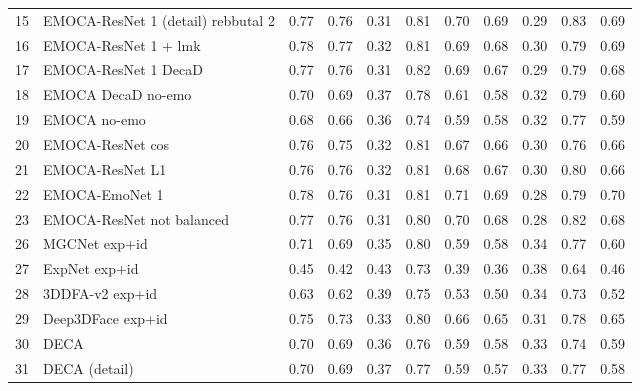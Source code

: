 \begin{tabular}{llrrrrrrrrr}
15 &  EMOCA-ResNet 1 (detail) rebbutal 2 &   0.77 &   0.76 &    0.31 &    0.81 &   0.70 &   0.69 &    0.29 &    0.83 &      0.69 \\
16 &                EMOCA-ResNet 1 + lmk &   0.78 &   0.77 &    0.32 &    0.81 &   0.69 &   0.68 &    0.30 &    0.79 &      0.69 \\
17 &                EMOCA-ResNet 1 DecaD &   0.77 &   0.76 &    0.31 &    0.82 &   0.69 &   0.67 &    0.29 &    0.79 &      0.68 \\
18 &                  EMOCA DecaD no-emo &   0.70 &   0.69 &    0.37 &    0.78 &   0.61 &   0.58 &    0.32 &    0.79 &      0.60 \\
19 &                        EMOCA no-emo &   0.68 &   0.66 &    0.36 &    0.74 &   0.59 &   0.58 &    0.32 &    0.77 &      0.59 \\
20 &                    EMOCA-ResNet cos &   0.76 &   0.75 &    0.32 &    0.81 &   0.67 &   0.66 &    0.30 &    0.76 &      0.66 \\
21 &                     EMOCA-ResNet L1 &   0.76 &   0.76 &    0.32 &    0.81 &   0.68 &   0.67 &    0.30 &    0.80 &      0.66 \\
22 &                      EMOCA-EmoNet 1 &   0.78 &   0.76 &    0.31 &    0.81 &   0.71 &   0.69 &    0.28 &    0.79 &      0.70 \\
23 &           EMOCA-ResNet not balanced &   0.77 &   0.76 &    0.31 &    0.80 &   0.70 &   0.68 &    0.28 &    0.82 &      0.68 \\
26 &                       MGCNet exp+id &   0.71 &   0.69 &    0.35 &    0.80 &   0.59 &   0.58 &    0.34 &    0.77 &      0.60 \\
27 &                       ExpNet exp+id &   0.45 &   0.42 &    0.43 &    0.73 &   0.39 &   0.36 &    0.38 &    0.64 &      0.46 \\
28 &                     3DDFA-v2 exp+id &   0.63 &   0.62 &    0.39 &    0.75 &   0.53 &   0.50 &    0.34 &    0.73 &      0.52 \\
29 &                   Deep3DFace exp+id &   0.75 &   0.73 &    0.33 &    0.80 &   0.66 &   0.65 &    0.31 &    0.78 &      0.65 \\
30 &                                DECA &   0.70 &   0.69 &    0.36 &    0.76 &   0.59 &   0.58 &    0.33 &    0.74 &      0.59 \\
31 &                       DECA (detail) &   0.70 &   0.69 &    0.37 &    0.77 &   0.59 &   0.57 &    0.33 &    0.77 &      0.58 \\
\bottomrule
\end{tabular}
